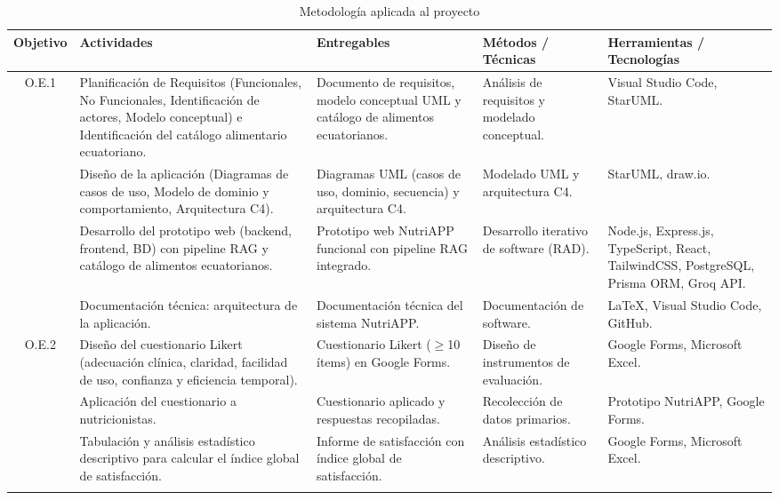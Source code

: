 \clearpage
\begin{landscape}
\begin{table}[h]
\centering
\caption{Metodología aplicada al proyecto}
\label{tab:metodologia}
\small
\begin{tabular}{|c|p{5.5cm}|p{3.8cm}|p{4cm}|p{4cm}|}
\hline
\textbf{Objetivo} & \textbf{Actividades} & \textbf{Entregables} &
\textbf{Métodos / Técnicas} & \textbf{Herramientas / Tecnologías} \\
\hline

\multirow{4}{*}{O.E.1}
& Planificación de Requisitos (Funcionales, No Funcionales, Identificación de actores, Modelo conceptual) e Identificación del catálogo alimentario ecuatoriano.
& Documento de requisitos, modelo conceptual UML y catálogo de alimentos ecuatorianos.
& Análisis de requisitos y modelado conceptual.
& Visual Studio Code, StarUML. \\ \cline{2-5}

& Diseño de la aplicación (Diagramas de casos de uso, Modelo de dominio y comportamiento, Arquitectura C4).
& Diagramas UML (casos de uso, dominio, secuencia) y arquitectura C4.
& Modelado UML y arquitectura C4.
& StarUML, draw.io. \\ \cline{2-5}

& Desarrollo del prototipo web (backend, frontend, BD) con pipeline RAG y catálogo de alimentos ecuatorianos.
& Prototipo web NutriAPP funcional con pipeline RAG integrado.
& Desarrollo iterativo de software (RAD).
& Node.js, Express.js, TypeScript, React, TailwindCSS, PostgreSQL, Prisma ORM, Groq API. \\ \cline{2-5}

& Documentación técnica: arquitectura de la aplicación.
& Documentación técnica del sistema NutriAPP.
& Documentación de software.
& \LaTeX, Visual Studio Code, GitHub. \\
\hline

\multirow{4}{*}{O.E.2}
& Diseño del cuestionario Likert (adecuación clínica, claridad, facilidad de uso, confianza y eficiencia temporal).
& Cuestionario Likert ($\geq$10 ítems) en Google Forms.
& Diseño de instrumentos de evaluación.
& Google Forms, Microsoft Excel. \\ \cline{2-5}

& Aplicación del cuestionario a nutricionistas.
& Cuestionario aplicado y respuestas recopiladas.
& Recolección de datos primarios.
& Prototipo NutriAPP, Google Forms. \\ \cline{2-5}

& Tabulación y análisis estadístico descriptivo para calcular el índice global de satisfacción.
& Informe de satisfacción con índice global de satisfacción.
& Análisis estadístico descriptivo.
& Google Forms, Microsoft Excel. \\ \cline{2-5}


\end{tabular}
\end{table}
\end{landscape}
